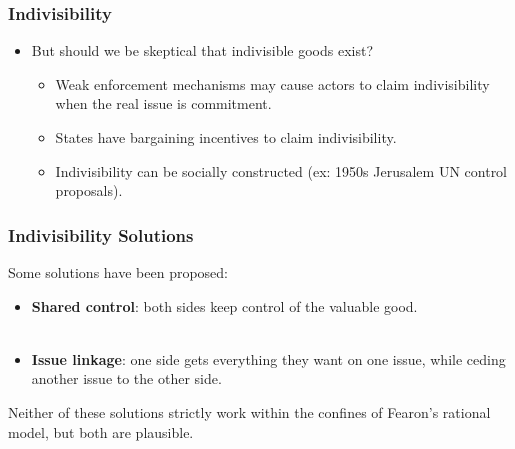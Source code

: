 \documentclass{beamer}
\begin{document}

\begin{frame} 
	\frametitle{\LARGE{Indivisibility}}
	\begin{itemize}
		\item But should we be skeptical that indivisible goods exist? \pause 
		\begin{itemize}
			\item Weak enforcement mechanisms may cause actors to claim indivisibility when the real issue is commitment. \pause 
			\item States have bargaining incentives to claim indivisibility. \pause 
			\item Indivisibility can be socially constructed (ex: 1950s Jerusalem UN control proposals).
		\end{itemize}
	\end{itemize}
\end{frame}

\begin{frame} 
	\frametitle{\LARGE{Indivisibility Solutions}}
	Some solutions have been proposed:
	\begin{itemize}
		\item \textbf{Shared control}: both sides keep control of the valuable good. \pause \\~\\
		\item \textbf{Issue linkage}: one side gets everything they want on one issue, while ceding another issue to the other side. \pause 
	\end{itemize}
	Neither of these solutions strictly work within the confines of Fearon's rational model, but both are plausible.
\end{frame}
\end{document}
